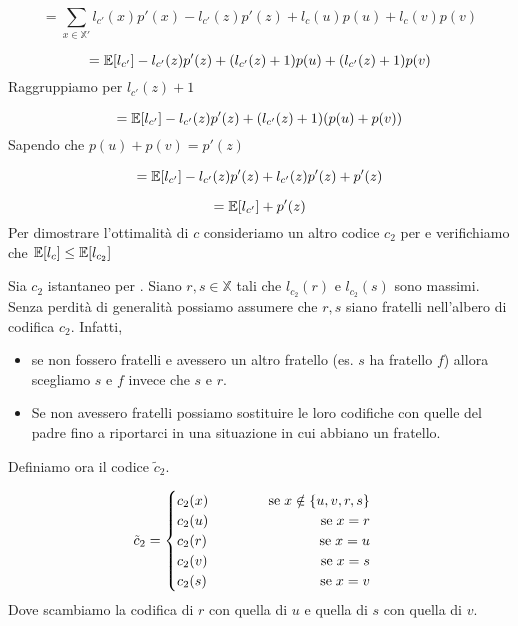 \documentclass[12pt]{report}
\begin{document}
\begin{dimo}
        $$= \sum_{x \in \mathbb{X}'} l_{c'}(x) p'(x) - l_{c'}(z) p'(z) + l_c(u) p(u) + l_c(v) p(v) $$

        $$= \mathbb{E}[l_{c'}] - l_{c'}(z) p'(z) + (l_{c'}(z) + 1)p(u) + (l_{c'}(z) +1) p(v)$$
        Raggruppiamo per $l_{c'}(z) + 1$

        $$= \mathbb{E}[l_{c'}] - l_{c'}(z) p'(z) + (l_{c'}(z) + 1)(p(u) + p(v))$$
        Sapendo che $p(u) + p(v) = p'(z)$

        $$= \mathbb{E}[l_{c'}] - l_{c'}(z) p'(z) + l_{c'}(z) p'(z) + p'(z)$$

        $$= \mathbb{E}[l_{c'}] + p'(z)$$
        Per dimostrare l'ottimalità di $c$ consideriamo un altro codice $c_2$ per \modello e verifichiamo che $\mathbb{E}[l_c] \leq \mathbb{E}[l_{c_2}]$

        \noindent
        Sia $c_2$ istantaneo per \modello. Siano $r,s \in \mathbb{X}$ tali che $l_{c_2} (r)$ e $l_{c_2}(s)$ sono massimi. Senza perdità di generalità possiamo assumere che $r,s$ siano fratelli nell'albero di codifica $c_2$. Infatti,

        \begin{itemize}
            \item  se non fossero fratelli e avessero un altro fratello (es. $s$ ha fratello $f$) allora scegliamo $s$ e $f$ invece che $s$ e $r$.
            \item  Se non avessero fratelli possiamo sostituire le loro codifiche con quelle del padre fino a riportarci in una situazione in cui abbiano un fratello.
        \end{itemize}

        \noindent
        Definiamo ora il codice $\tilde c_2$.

        $$ \tilde c_2 = \begin{cases}
                            c_2(x) \hspace{40px} \;\text{se}\;x \notin \{u,v,r,s\}\\
                            c_2(u)  \hfill \; \text{se} \; x = r \\
                            c_2(r)  \hfill \; \text{se} \; x = u \\
                            c_2(v)  \hfill \; \text{se} \; x = s \\
                            c_2(s)  \hfill \; \text{se} \; x = v
        \end{cases}$$
        Dove scambiamo la codifica di $r$ con quella di $u$ e quella di $s$ con quella di $v$.

        \vspace{5px}


\end{dimo}
\end{document}
